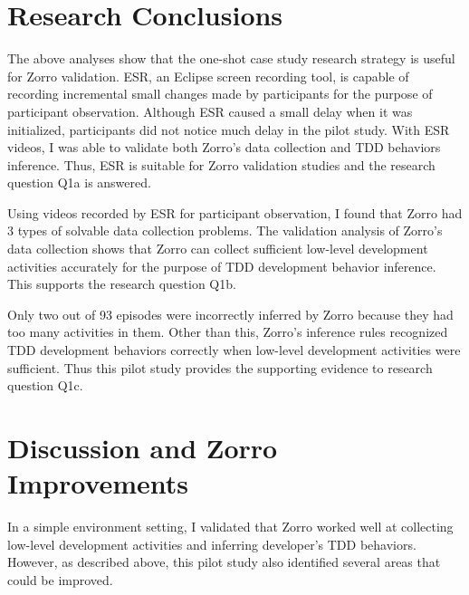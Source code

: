 \section{Research Conclusions}
The above analyses show that the one-shot case study research strategy is useful for Zorro validation. ESR, an Eclipse screen recording tool, is capable of recording incremental small changes made by participants for the purpose of participant observation. Although ESR caused a small delay when it was initialized, participants did not notice much delay in the pilot study. With ESR videos, I was able to validate both Zorro's data collection and TDD behaviors inference. Thus, ESR is suitable for Zorro validation studies and the research question Q1a is answered. 

Using videos recorded by ESR for participant observation, I found that Zorro had 3 types of solvable data collection problems. The validation analysis of Zorro's data collection shows that Zorro can collect sufficient low-level development activities accurately for the purpose of TDD development behavior inference. This supports the research question Q1b. 

Only two out of 93 episodes were incorrectly inferred by Zorro because they had too many activities in them. Other than this, Zorro's inference rules recognized TDD development behaviors correctly when low-level development activities were sufficient. Thus this pilot study provides the supporting evidence to research question Q1c. 

\section{Discussion and Zorro Improvements}
In a simple environment setting, I validated that Zorro worked well at collecting low-level development activities and inferring developer's TDD behaviors. However, as described above, this pilot study also identified several areas that could be improved. 

